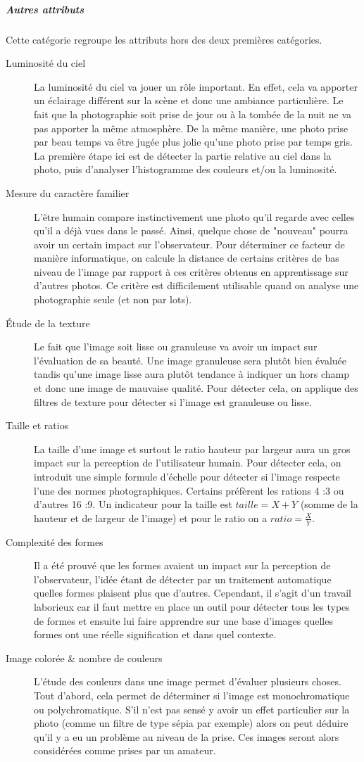 \documentclass[11pt, french]{report-rd-info}
\begin{document}
\subparagraph{Autres attributs}
Cette catégorie regroupe les attributs hors des deux premières catégories.
\begin{description}

\item[Luminosité du ciel]
La luminosité du ciel va jouer un rôle important. En effet, cela va apporter un éclairage différent sur la scène et donc une ambiance particulière. Le fait que la photographie soit prise de jour ou à la tombée de la nuit ne va pas apporter la même atmosphère. De la même manière, une photo prise par beau temps va être jugée plus jolie qu’une photo prise par temps gris. La première étape ici est de détecter la partie relative au ciel dans la photo, puis d’analyser l’histogramme des couleurs et/ou la luminosité.
\item[Mesure du caractère familier]
L’être humain compare instinctivement une photo qu’il regarde avec celles qu’il a déjà vues dans le passé. Ainsi, quelque chose de "nouveau" pourra avoir un certain impact sur l’observateur. Pour déterminer ce facteur de manière informatique, on calcule la distance de certains critères de bas niveau de l’image par rapport à ces critères obtenus en apprentissage sur d’autres photos. Ce critère est difficilement utilisable quand on analyse une photographie seule (et non par lots).
\item[Étude de la texture]
Le fait que l’image soit lisse ou granuleuse va avoir un impact sur l’évaluation de sa beauté. Une image granuleuse sera plutôt bien évaluée tandis qu’une image lisse aura plutôt tendance à indiquer un hors champ et donc une image de mauvaise qualité. Pour détecter cela, on applique des filtres de texture pour détecter si l’image est granuleuse ou lisse.
\item[Taille et ratios]
La taille d’une image et surtout le ratio hauteur par largeur aura un gros impact sur la perception de l’utilisateur humain. Pour détecter cela, on introduit une simple formule d’échelle pour détecter si l’image respecte l’une des normes photographiques. Certains préfèrent les rations 4 :3 ou d’autres 16 :9. Un indicateur pour la taille est $taille = X+Y$ (somme de la hauteur et de largeur de l'image) et pour le ratio on a $ratio = \frac{X}{Y}$.
\item[Complexité des formes]
Il a été prouvé que les formes avaient un impact sur la perception de l’observateur, l'idée étant de détecter par un traitement automatique quelles formes plaisent plus que d’autres. Cependant, il s’agit d’un travail laborieux car il faut mettre en place un outil pour détecter tous les types de formes et ensuite lui faire apprendre sur une base d’images quelles formes ont une réelle signification et dans quel contexte.
\item[Image colorée \& nombre de couleurs]
L’étude des couleurs dans une image permet d’évaluer plusieurs choses. Tout d’abord, cela permet de déterminer si l’image est monochromatique  ou polychromatique. S’il n’est pas sensé y avoir un effet particulier sur la photo (comme un filtre de type sépia par exemple) alors on peut déduire qu’il y a eu un problème au niveau de la prise. Ces images seront alors considérées comme prises par un amateur.


\end{description}
\end{document}

